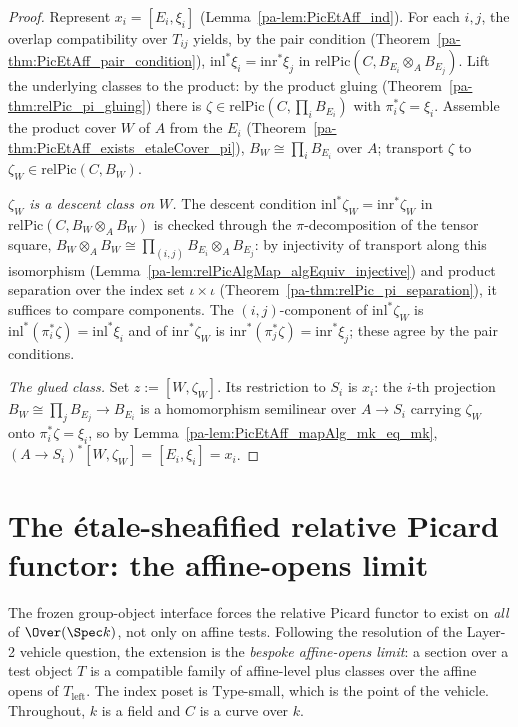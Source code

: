 \begin{proof}
  \leanok
  Represent \(x_i = [E_i, \xi_i]\) (Lemma~\ref{pa-lem:PicEtAff_ind}). For each \(i, j\), the overlap
  compatibility over \(T_{ij}\) yields, by the pair condition
  (Theorem~\ref{pa-thm:PicEtAff_pair_condition}), \(\mathrm{inl}^{*}\xi_i = \mathrm{inr}^{*}\xi_j\) in
  \(\mathrm{relPic}(C, B_{E_i} \otimes_A B_{E_j})\). Lift the underlying classes to the product: by
  the product gluing (Theorem~\ref{pa-thm:relPic_pi_gluing}) there is \(\zeta \in \mathrm{relPic}(C,
  \prod_i B_{E_i})\) with \(\pi_i^{*}\zeta = \xi_i\). Assemble the product cover \(W\) of \(A\) from
  the \(E_i\) (Theorem~\ref{pa-thm:PicEtAff_exists_etaleCover_pi}), \(B_W \cong \prod_i B_{E_i}\) over
  \(A\); transport \(\zeta\) to \(\zeta_W \in \mathrm{relPic}(C, B_W)\).

  \emph{\(\zeta_W\) is a descent class on \(W\).} The descent condition \(\mathrm{inl}^{*}\zeta_W =
  \mathrm{inr}^{*}\zeta_W\) in \(\mathrm{relPic}(C, B_W \otimes_A B_W)\) is checked through the
  \(\pi\)-decomposition of the tensor square, \(B_W \otimes_A B_W \cong \prod_{(i, j)} B_{E_i}
  \otimes_A B_{E_j}\): by injectivity of transport along this isomorphism
  (Lemma~\ref{pa-lem:relPicAlgMap_algEquiv_injective}) and product separation over the index set
  \(\iota \times \iota\) (Theorem~\ref{pa-thm:relPic_pi_separation}), it suffices to compare
  components. The \((i, j)\)-component of \(\mathrm{inl}^{*}\zeta_W\) is \(\mathrm{inl}^{*}
  (\pi_i^{*}\zeta) = \mathrm{inl}^{*}\xi_i\) and of \(\mathrm{inr}^{*}\zeta_W\) is
  \(\mathrm{inr}^{*}(\pi_j^{*}\zeta) = \mathrm{inr}^{*}\xi_j\); these agree by the pair conditions.

  \emph{The glued class.} Set \(z := [W, \zeta_W]\). Its restriction to \(S_i\) is \(x_i\): the
  \(i\)-th projection \(B_W \cong \prod_j B_{E_j} \to B_{E_i}\) is a homomorphism semilinear over
  \(A \to S_i\) carrying \(\zeta_W\) onto \(\pi_i^{*}\zeta = \xi_i\), so by
  Lemma~\ref{pa-lem:PicEtAff_mapAlg_mk_eq_mk}, \((A \to S_i)^{*}[W, \zeta_W] = [E_i, \xi_i] = x_i\).
\end{proof}

\section{The \'etale-sheafified relative Picard functor: the affine-opens limit}

The frozen group-object interface forces the relative Picard functor to exist on \emph{all} of
\(\Over(\Spec k)\), not only on affine tests. Following the resolution of the Layer-2 vehicle
question, the extension is the \emph{bespoke affine-opens limit}: a section over a test object
\(T\) is a compatible family of affine-level plus classes over the affine opens of
\(T_{\mathrm{left}}\). The index poset is \(\mathrm{Type}\)-small, which is the point of the
vehicle. Throughout, \(k\) is a field and \(C\) is a curve over \(k\).

